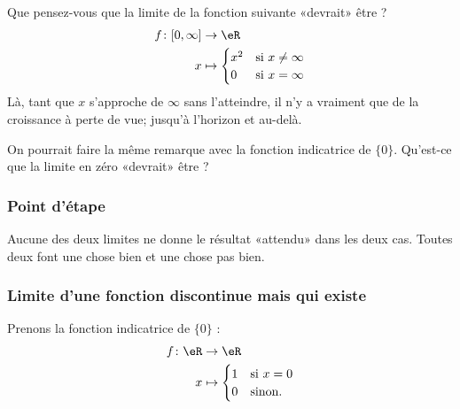Que pensez-vous que la limite de la fonction suivante «devrait» être ?
\begin{equation}
	\begin{aligned}
		f\colon \mathopen[ 0 , \infty \mathclose] & \to \eR                            \\
		x                                         & \mapsto \begin{cases}
			x^2 & \text{si } x\neq \infty \\
			0   & \text{si }x=\infty
		\end{cases}
	\end{aligned}
\end{equation}
Là, tant que \( x\) s'approche de \( \infty\) sans l'atteindre, il n'y a vraiment que de la croissance à perte de vue; jusqu'à l'horizon et au-delà.

On pourrait faire la même remarque avec la fonction indicatrice de \( \{ 0 \}\). Qu'est-ce que la limite en zéro «devrait» être ?

\subsubsection{Point d'étape}

Aucune des deux limites ne donne le résultat «attendu» dans les deux cas. Toutes deux font une chose bien et une chose pas bien.

\subsubsection{Limite d'une fonction discontinue mais qui existe}

Prenons la fonction indicatrice de \( \{ 0 \}\) :
\begin{equation}
	\begin{aligned}
		f\colon\eR & \to \eR                            \\
		x          & \mapsto \begin{cases}
			1 & \text{si } x=0 \\
			0 & \text{sinon. }
		\end{cases}
	\end{aligned}
\end{equation}

